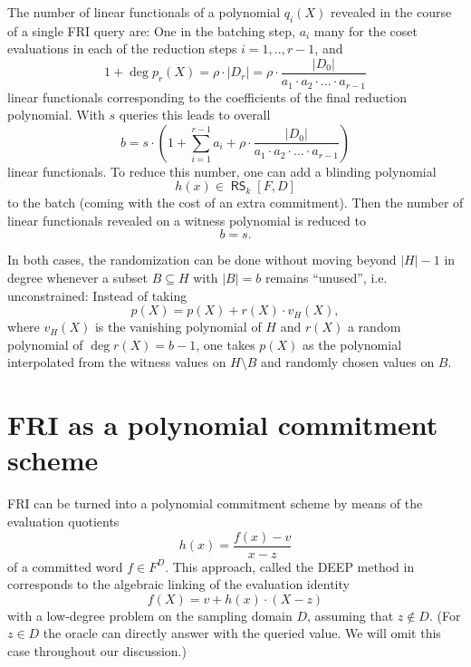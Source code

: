 \documentclass[11pt,article,oneside]{memoir}
\theoremstyle{definition}
\theoremstyle{remark}
\DeclareMathOperator{\RS}{\mathsf{RS}}
\begin{document}
The number of linear functionals of a polynomial $q_i(X)$ revealed in the course of a single FRI query are:  
One in the batching step, $a_i$ many for the coset evaluations in each of the reduction steps $i=1,..,r-1$, and 
\[
1+ \deg p_r(X) = \rho\cdot |D_r| =  \rho\cdot\frac{ |D_0|}{a_1\cdot a_2\cdot \ldots \cdot a_{r-1}}
\] 
linear functionals corresponding to the coefficients of the final reduction polynomial.
With $s$ queries this leads to overall
\begin{equation}
b=s\cdot (1+ \sum_{i=1}^{r-1} a_i + \rho\cdot \frac{|D_0|}{a_1\cdot a_2\cdot \ldots \cdot a_{r-1}})
\end{equation}
linear functionals. To reduce this number, one can add a blinding polynomial 
\[
h(x) \in \RS_k[F,D] 
\]
to the batch (coming with the cost of an extra commitment). 
Then the number of linear functionals revealed on a witness polynomial is reduced to
\begin{equation}
b= s. 
\end{equation}

In both cases, the randomization can be done without moving beyond $|H|-1$ in degree whenever a subset $B\subseteq H$ with $|B|=b$ remains “unused”, i.e. unconstrained: 
Instead of taking 
\[
p(X)= p(X) + r(X)\cdot v_H(X),
\]
where $v_H(X)$ is the vanishing polynomial of $H$ and $r(X)$ a random polynomial of $\deg r(X)= b - 1$, one takes $p(X)$ as the polynomial interpolated from the witness values on $H\setminus B$ and randomly chosen values on $B$.


\chapter{FRI as a polynomial commitment scheme}
\label{ch:Polycommit}

FRI can be turned into a polynomial commitment scheme by means of the evaluation quotients
\begin{equation*}
h(x)=\frac{f(x)-v}{x-z}
\end{equation*}
of a committed word $f\in F^D$. 
This approach, called the DEEP method in \cite{DEEPFRI}  corresponds to the algebraic linking of the evaluation identity
\begin{equation*}
f(X) = v + h(x)\cdot (X-z)
\end{equation*}
with a low-degree problem on the sampling domain $D$, assuming that $z\notin D$. 
(For $z\in D$ the oracle can directly answer with the queried value. We will omit this case throughout our discussion.)
\end{document}
